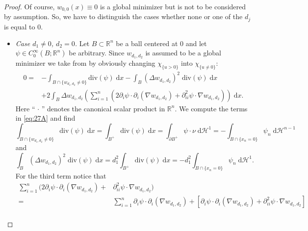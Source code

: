 \documentclass[twoside,11pt]{article}
\theoremstyle{definition}
\begin{document}
\begin{proof}Of course, $w_{0,0}(x)\equiv 0$ is a global minimizer but is not to be considered by assumption.
	So, we have to distinguish the cases whether none or one  of the $d_j$ is equal to $0$.
	\begin{itemize}
		\item[(a)] \textit{Case $d_1\not=0$, $d_2=0$.} 
		Let $B \subset \mathbb{R}^n$ be a ball centered at $0$ and let $\psi \in C_0^\infty(B;\mathbb{R}^n)$ be arbitrary. Since $w_{d_1,d_2}$ is assumed to be a global minimizer we take from \cite[Lemma 4.4]{DKV20} by  obviously changing $\chi_{\{u>0\}}$ into $\chi_{\{u\not=0\}}$:
		\begin{align}
			0  = &- \int_{B\cap\{ w_{d_1,d_2} \neq 0 \}} \mathrm{div}(\psi) \; \mathrm{d}x - \int_B (\Delta w_{d_1,d_2})^2 \; \mathrm{div}(\psi) \; \mathrm{d}x\nonumber\\
			& + 2 \int_B \Delta w_{d_1,d_2} \left( \sum_{i = 1}^n \left(2 \partial_i \psi \cdot \partial_i(\nabla w_{d_1,d_2}) + \partial^2_{ii} \psi \cdot \nabla  w_{d_1,d_2} \right) \right)\; \mathrm{d}x.\label{eq:27A}
		\end{align}
	Here ``$\, \cdot\, $'' denotes the canonical scalar 
    product in $\mathbb{R}^n$.
		We compute the terms in \eqref{eq:27A} and find
		\begin{equation*}
			\int_{B\cap \{ w_{d_1,d_2} \neq 0 \}} \mathrm{div}(\psi) \; \mathrm{d}x = \int_{B^+} \mathrm{div}(\psi) \; \mathrm{d}x = \int_{\partial B^+} \psi \cdot \nu \; \mathrm{d}\mathcal{H}^{1} = - \int_{B \cap \{ x_n = 0 \}} \psi_n \; \mathrm{d}\mathcal{H}^{n-1}  
		\end{equation*}
		and 
		\begin{equation*}
			\int_B (\Delta w_{d_1,d_2})^2 \; \mathrm{div}(\psi) \; \mathrm{d}x = d_1^2 \int_{B^+} \mathrm{div}(\psi) \; \mathrm{d}x = - d_1^2  \int_{B \cap \{ x_n = 0 \}} \psi_n \; \mathrm{d}\mathcal{H}^1.  
		\end{equation*}
		For the third term notice that 
		\begin{align*}
			\sum_{i = 1}^n (2 \partial_i \psi \cdot \partial_i(\nabla w_{d_1,d_2}) +& \partial^2_{ii} \psi \cdot \nabla  w_{d_1,d_2} )\\
			 =&
			 \sum_{i = 1}^n \partial_i \psi \cdot  \partial_i (\nabla w_{d_1,d_2}) + [\partial_i \psi \cdot \partial_i(\nabla w_{d_1,d_2}) + \partial^2_{ii} \psi \cdot \nabla  w_{d_1,d_2} ]\\

\end{align*}
\end{itemize}
\end{proof}
\end{document}
